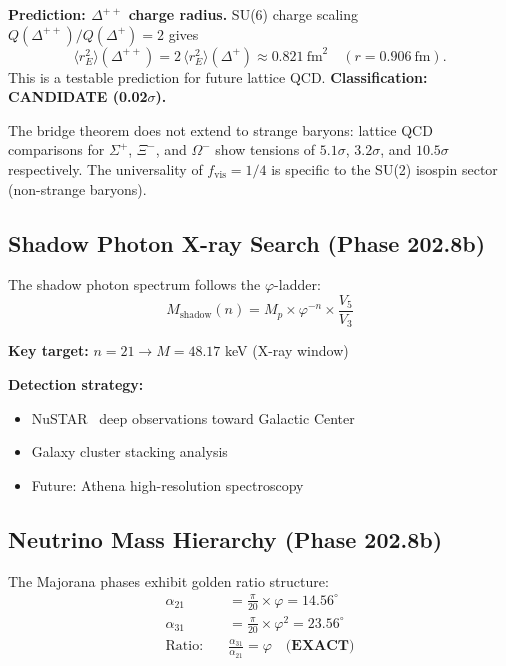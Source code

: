 \documentclass[aps,prd,twocolumn,superscriptaddress,floatfix,nofootinbib]{revtex4-2}
\theoremstyle{definition}
\theoremstyle{remark}
\newcommand{\vp}{\varphi}
\begin{document}
\textbf{Prediction: $\Delta^{++}$ charge radius.}
SU(6) charge scaling $Q(\Delta^{++})/Q(\Delta^+)=2$ gives
\begin{equation}
  \langle r^2_E\rangle(\Delta^{++}) = 2\,\langle r^2_E\rangle(\Delta^+) \approx 0.821~\text{fm}^2
  \quad (r = 0.906~\text{fm}).
  \label{eq:delta-pp}
\end{equation}
This is a testable prediction for future lattice QCD.  \textbf{Classification: CANDIDATE (0.02$\sigma$).}

The bridge theorem does not extend to strange baryons: lattice QCD comparisons for
$\Sigma^+$, $\Xi^-$, and $\Omega^-$ show tensions of $5.1\sigma$, $3.2\sigma$, and
$10.5\sigma$ respectively.  The universality of $f_\mathrm{vis}=1/4$ is specific to the
SU(2) isospin sector (non-strange baryons).

\subsection{Shadow Photon X-ray Search (Phase 202.8b)}

The shadow photon spectrum follows the $\vp$-ladder:
\begin{equation}
M_{\text{shadow}}(n) = M_p \times \vp^{-n} \times \frac{V_5}{V_3}
\end{equation}

\textbf{Key target:} $n=21 \to M = 48.17$ keV (X-ray window)

\textbf{Detection strategy:}
\begin{itemize}
\item NuSTAR~\cite{nustar} deep observations toward Galactic Center
\item Galaxy cluster stacking analysis
\item Future: Athena high-resolution spectroscopy
\end{itemize}

\subsection{Neutrino Mass Hierarchy (Phase 202.8b)}

The Majorana phases exhibit golden ratio structure:
\begin{align}
\alpha_{21} &= \frac{\pi}{20} \times \vp = 14.56^\circ \\
\alpha_{31} &= \frac{\pi}{20} \times \vp^2 = 23.56^\circ \\
\text{Ratio:} \quad & \frac{\alpha_{31}}{\alpha_{21}} = \vp \quad \textbf{(EXACT)}
\end{align}
\end{document}
